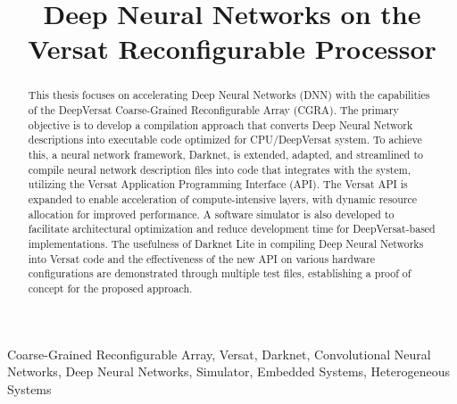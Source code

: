 \documentclass[conference]{IEEEtran}
\begin{document}
\lstset{language=C++}
\lstset{basicstyle=\scriptsize}
	


\title{Deep Neural Networks on the Versat Reconfigurable Processor\\ }

\author{
}

\maketitle

\begin{abstract}
This thesis focuses on accelerating Deep Neural Networks (DNN) with the capabilities of the DeepVersat Coarse-Grained Reconfigurable Array (CGRA). The primary objective is to develop a compilation approach that converts Deep Neural Network descriptions into executable code optimized for CPU/DeepVersat system. To achieve this, a neural network framework, Darknet, is extended, adapted, and streamlined to compile neural network description files into code that integrates with the system, utilizing the Versat Application Programming Interface (API). The Versat API is expanded to enable acceleration of compute-intensive layers, with dynamic resource allocation for improved performance. A software simulator is also developed to facilitate architectural optimization and reduce development time for DeepVersat-based implementations.
The usefulness of Darknet Lite in compiling Deep Neural Networks into Versat code and the effectiveness of the new API on various hardware configurations are demonstrated through multiple test files, establishing a proof of concept for the proposed approach.
    
\end{abstract}

\begin{IEEEkeywords}
    Coarse-Grained Reconfigurable Array, Versat, Darknet, Convolutional Neural Networks, Deep Neural Networks, Simulator, Embedded Systems, Heterogeneous Systems
\end{IEEEkeywords}
\end{document}
